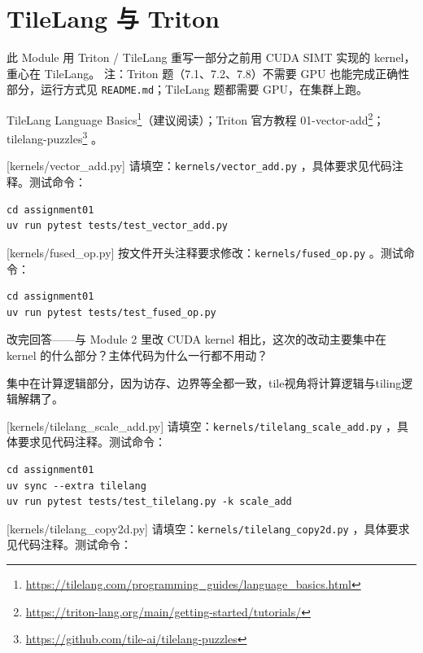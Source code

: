 \documentclass[11pt,a4paper,fontset=none]{ctexart}
\begin{document}
\section{TileLang 与 Triton}

此 Module 用 Triton / TileLang 重写一部分之前用 CUDA SIMT 实现的 kernel，重心在 TileLang。
注：Triton 题（7.1、7.2、7.8）不需要 GPU 也能完成正确性部分，运行方式见 \texttt{README.md}；TileLang 题都需要 GPU，在集群上跑。

\begin{reading}
TileLang Language Basics\footnote{\url{https://tilelang.com/programming_guides/language_basics.html}}（建议阅读）；Triton 官方教程 01-vector-add\footnote{\url{https://triton-lang.org/main/getting-started/tutorials/}}；tilelang-puzzles\footnote{\url{https://github.com/tile-ai/tilelang-puzzles}} 。
\end{reading}

[kernels/vector\_add.py]
请填空：\texttt{kernels/vector\_add.py} ，具体要求见代码注释。测试命令：

\begin{lstlisting}
cd assignment01
uv run pytest tests/test_vector_add.py
\end{lstlisting}

[kernels/fused\_op.py]
按文件开头注释要求修改：\texttt{kernels/fused\_op.py} 。测试命令：

\begin{lstlisting}
cd assignment01
uv run pytest tests/test_fused_op.py
\end{lstlisting}

改完回答——与 Module 2 里改 CUDA kernel 相比，这次的改动主要集中在 kernel 的什么部分？主体代码为什么一行都不用动？

集中在计算逻辑部分，因为访存、边界等全都一致，tile视角将计算逻辑与tiling逻辑解耦了。

[kernels/tilelang\_scale\_add.py]
请填空：\texttt{kernels/tilelang\_scale\_add.py} ，具体要求见代码注释。测试命令：

\begin{lstlisting}
cd assignment01
uv sync --extra tilelang
uv run pytest tests/test_tilelang.py -k scale_add
\end{lstlisting}

[kernels/tilelang\_copy2d.py]
请填空：\texttt{kernels/tilelang\_copy2d.py} ，具体要求见代码注释。测试命令：
\end{document}
